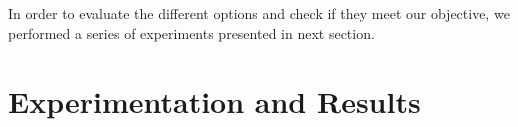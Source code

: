 \documentclass[sigconf]{acmart}
\begin{document}




In order to evaluate the different options and check if they meet our
objective, we performed a series of experiments presented in next
section. 

\section{Experimentation and Results}\label{ch:res}
\end{document}
